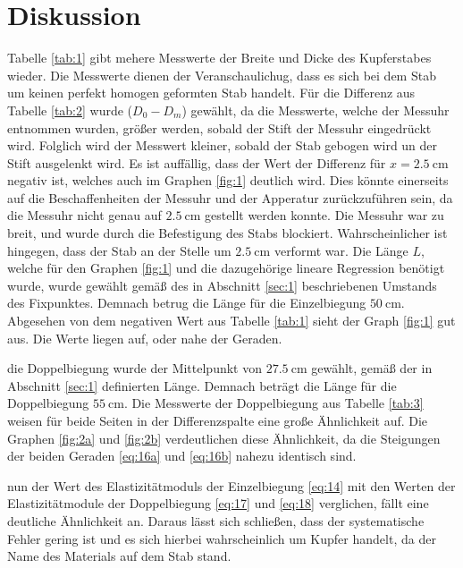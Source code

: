 \section{Diskussion}\justifying
{}\justifying Tabelle \ref{tab:1} gibt mehere Messwerte der Breite und Dicke des Kupferstabes wieder. Die Messwerte dienen der Veranschaulichug, dass es sich
bei dem Stab um keinen perfekt homogen geformten Stab handelt. Für die Differenz aus Tabelle \ref{tab:2} wurde ($D_0-D_m$) gewählt, da die Messwerte, 
welche der Messuhr entnommen wurden, größer werden, sobald der Stift der Messuhr eingedrückt wird. Folglich wird der Messwert kleiner, sobald der 
Stab gebogen wird un der Stift ausgelenkt wird. Es ist auffällig, dass der Wert der Differenz für  $x = \SI{2.5}{\centi\meter}$ negativ ist, 
welches auch im Graphen \ref{fig:1} deutlich wird. Dies könnte einerseits auf die Beschaffenheiten der Messuhr und der Apperatur zurückzuführen 
sein, da die Messuhr nicht genau auf $\SI{2.5}{\centi\meter}$ gestellt werden konnte. Die Messuhr war zu breit, und wurde durch die Befestigung des 
Stabs blockiert. Wahrscheinlicher ist hingegen, dass der Stab an der Stelle um $\SI{2.5}{\centi\meter}$ verformt war. Die Länge $L$, welche für den 
Graphen \ref{fig:1} und die dazugehörige lineare Regression benötigt wurde, wurde gewählt gemäß des in Abschnitt \ref{sec:1} beschriebenen Umstands des 
Fixpunktes. Demnach betrug die Länge für die Einzelbiegung $\SI{50}{\centi\meter}$. Abgesehen von dem negativen Wert aus Tabelle \ref{tab:1} sieht 
der Graph \ref{fig:1} gut aus. Die Werte liegen auf, oder nahe der Geraden. 

\justifying die Doppelbiegung wurde der Mittelpunkt von $\SI{27.5}{\centi\meter}$ gewählt, gemäß der in Abschnitt \ref{sec:1} definierten Länge.
Demnach beträgt die Länge für die Doppelbiegung $\SI{55}{\centi\meter}$. Die Messwerte der Doppelbiegung aus Tabelle \ref{tab:3} weisen für beide Seiten 
in der Differenzspalte eine große Ähnlichkeit auf. Die Graphen \ref{fig:2a} und \ref{fig:2b} verdeutlichen diese Ähnlichkeit, da die Steigungen der beiden
Geraden \eqref{eq:16a} und \eqref{eq:16b} nahezu identisch sind. 

\justifying nun der Wert des Elastizitätmoduls der Einzelbiegung \eqref{eq:14} mit den Werten der Elastizitätmodule der Doppelbiegung \eqref{eq:17}
und \eqref{eq:18} verglichen, fällt eine deutliche Ähnlichkeit an. Daraus lässt sich schließen, dass der systematische Fehler gering ist und es
sich hierbei wahrscheinlich um Kupfer handelt, da der Name des Materials auf dem Stab stand.

